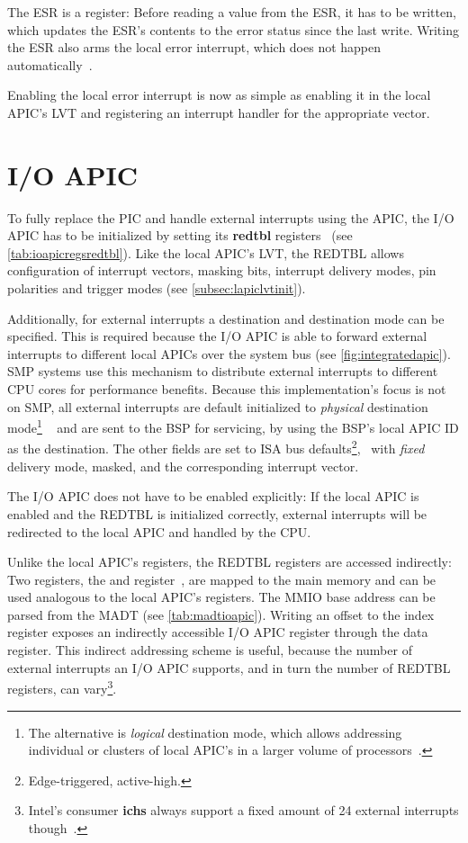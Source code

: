 The ESR is a  register: Before reading a value from the ESR, it has to be written, which updates the ESR's contents to the error status since the last write.
Writing the ESR also arms the local error interrupt, which does not happen automatically~\autocite[sec.~3.11.5.3]{ia32}.

Enabling the local error interrupt is now as simple as enabling it in the local APIC's LVT and registering an interrupt handler for the appropriate vector.

\section{I/O APIC}
\label{sec:ioapicinit}

To fully replace the PIC and handle external interrupts using the APIC, the I/O APIC has to be initialized by setting its \textbf{\gls{redtbl}} registers~\autocite[sec.~9.5.8]{ich5} (see \autoref{tab:ioapicregsredtbl}).
Like the local APIC's LVT, the REDTBL allows configuration of interrupt vectors, masking bits, interrupt delivery modes, pin polarities and trigger modes (see \autoref{subsec:lapiclvtinit}).

Additionally, for external interrupts a destination and destination mode can be specified.
This is required because the I/O APIC is able to forward external interrupts to different local APICs over the system bus (see \autoref{fig:integratedapic}).
SMP systems use this mechanism to distribute external interrupts to different CPU cores for performance benefits.
Because this implementation's focus is not on SMP, all external interrupts are default initialized to \textit{physical} destination mode\footnote{
  The alternative is \textit{logical} destination mode, which allows addressing individual or clusters of local APIC's in a larger volume of processors~\autocite[sec.~3.11.6.2.2]{ia32}.}
~\autocite[sec.~3.11.6.2.1]{ia32} and are sent to the BSP for servicing, by using the BSP's local APIC ID as the destination.
The other fields are set to ISA bus defaults\footnote{
  Edge-triggered, active-high.},
\ with \textit{fixed} delivery mode, masked, and the corresponding interrupt vector.

The I/O APIC does not have to be enabled explicitly: If the local APIC is enabled and the REDTBL is initialized correctly, external interrupts will be redirected to the local APIC and handled by the CPU\@.

Unlike the local APIC's registers, the REDTBL registers are accessed indirectly: Two registers, the  and  register~\autocite[sec.~9.5.1]{ich5}, are mapped to the main memory and can be used analogous to the local APIC's registers.
The MMIO base address can be parsed from the MADT (see \autoref{tab:madtioapic}).
Writing an offset to the index register exposes an indirectly accessible I/O APIC register through the data register.
This indirect addressing scheme is useful, because the number of external interrupts an I/O APIC supports, and in turn the number of REDTBL registers, can vary\footnote{
  Intel's consumer \textbf{\glspl{ich}} always support a fixed amount of 24 external interrupts though~\autocite[sec.~9.5.7]{ich5}.}.

